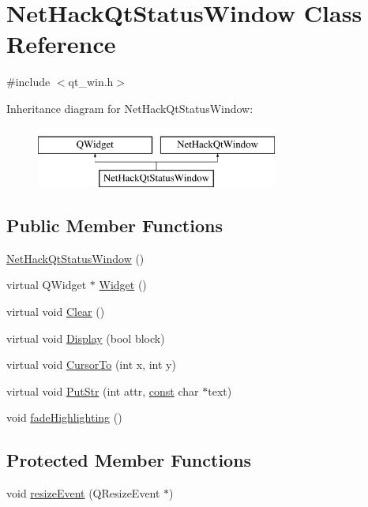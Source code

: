 \hypertarget{classNetHackQtStatusWindow}{\section{Net\+Hack\+Qt\+Status\+Window Class Reference}
\label{classNetHackQtStatusWindow}
}


{\ttfamily \#include $<$qt\+\_\+win.\+h$>$}

Inheritance diagram for Net\+Hack\+Qt\+Status\+Window\+:\begin{figure}[H]
\begin{center}
\leavevmode
\includegraphics[height=2.000000cm]{classNetHackQtStatusWindow}
\end{center}
\end{figure}
\subsection*{Public Member Functions}
\begin{DoxyCompactItemize}
\item 
\hyperlink{classNetHackQtStatusWindow_a3dd5eaa9dcf9e7271c748c5514b08cd6}{Net\+Hack\+Qt\+Status\+Window} ()
\item 
virtual Q\+Widget $\ast$ \hyperlink{classNetHackQtStatusWindow_a40f51fea10f3cc21307bd910f9415afb}{Widget} ()
\item 
virtual void \hyperlink{classNetHackQtStatusWindow_a3e70f5bac9c2c59682981cc89e455f04}{Clear} ()
\item 
virtual void \hyperlink{classNetHackQtStatusWindow_a35e5c2825226cf663b6b85fbaaf7ccd0}{Display} (bool block)
\item 
virtual void \hyperlink{classNetHackQtStatusWindow_a82ec6a1fe0e938c31a210e6601e022b9}{Cursor\+To} (int x, int y)
\item 
virtual void \hyperlink{classNetHackQtStatusWindow_aed4f97a47995190a14d80d505c75a065}{Put\+Str} (int attr, \hyperlink{tradstdc_8h_a2c212835823e3c54a8ab6d95c652660e}{const} char $\ast$text)
\item 
void \hyperlink{classNetHackQtStatusWindow_a091b4b21408ee15d0ef216fed44bfc4a}{fade\+Highlighting} ()
\end{DoxyCompactItemize}
\subsection*{Protected Member Functions}
\begin{DoxyCompactItemize}
\item 
void \hyperlink{classNetHackQtStatusWindow_ac5f9cdbbb6e71f7dc063c52e061d0c60}{resize\+Event} (Q\+Resize\+Event $\ast$)
\end{DoxyCompactItemize}
